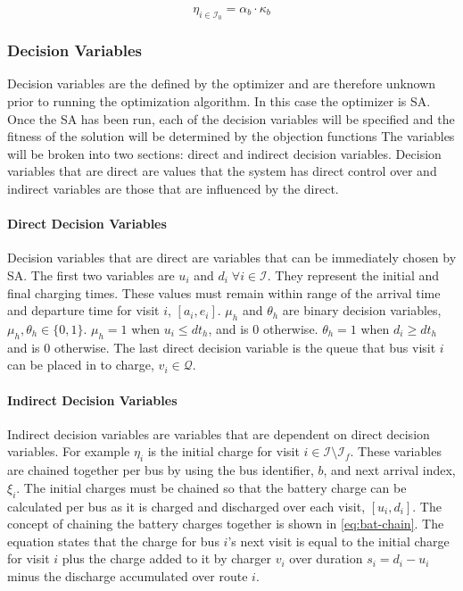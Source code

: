 \documentclass[11pt,a4paper,final]{article}
\newcommand{\Iset}{\mathcal{I}}             %
\newcommand{\Isetinit}{\mathcal{I}_0}       %
\newcommand{\Isetfinal}{\mathcal{I}_f}      %
\newcommand{\Qset}{\mathcal{Q}}             %
\begin{document}
\begin{equation}
\label{eq:batinit}
  \eta_{i \in \Isetinit} = \alpha_b \cdot \kappa_b
\end{equation}

\subsubsection{Decision Variables}
\label{sec:decision-variables}
Decision variables are the defined by the optimizer and are therefore unknown prior to running the optimization
algorithm. In this case the optimizer is SA. Once the SA has been run, each of the decision variables will be specified and
the fitness of the solution will be determined by the objection functions The variables will be broken into two
sections: direct and indirect decision variables. Decision variables that are direct are values that the system has
direct control over and indirect variables are those that are influenced by the direct.

\paragraph{Direct Decision Variables}
\label{sec:direct-decision-variables}
Decision variables that are direct are variables that can be immediately chosen by SA. The first two variables are \(u_i\)
and \(d_i \; \forall i \in \Iset\). They represent the initial and final charging times. These values must remain within range of
the arrival time and departure time for visit \(i\), \([a_i, e_i]\). \(\mu_h\) and \(\theta_h\) are binary decision variables, \(\mu_h,
\theta_h \in \{0, 1\}\). \(\mu_h = 1\) when \(u_i \le dt_h\), and is 0 otherwise. \(\theta_h = 1\) when \(d_i \ge dt_h\) and is 0 otherwise. The
last direct decision variable is the queue that bus visit \(i\) can be placed in to charge, \(v_i \in \Qset\).

\paragraph{Indirect Decision Variables}
\label{sec:indirect-decision-variables}
Indirect decision variables are variables that are dependent on direct decision variables. For example \(\eta_i\) is the
initial charge for visit \(i \in \Iset \setminus \Isetfinal\). These variables are chained together per bus by using the
bus identifier, \(b\), and next arrival index, \(\xi_i\). The initial charges must be chained so that the battery charge can
be calculated per bus as it is charged and discharged over each visit, \([u_i, d_i]\). The concept of chaining the battery
charges together is shown in \ref{eq:bat-chain}. The equation states that the charge for bus \(i\)'s next visit is equal to the
initial charge for visit \(i\) plus the charge added to it by charger \(v_i\) over duration \(s_i = d_i - u_i\) minus the discharge
accumulated over route \(i\).
\end{document}
